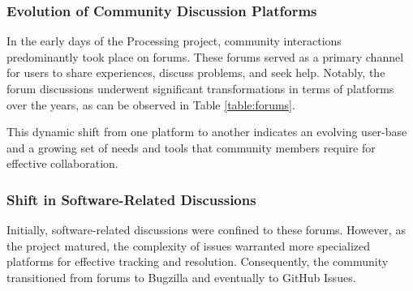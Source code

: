 \documentclass{article}
\begin{document}
\subsubsection*{Evolution of Community Discussion Platforms}
In the early days of the Processing project, community interactions predominantly took place on forums. These forums served as a primary channel for users to share experiences, discuss problems, and seek help. Notably, the forum discussions underwent significant transformations in terms of platforms over the years, as can be observed in Table \ref{table:forums}. \parencite{ProcessingForum}



This dynamic shift from one platform to another indicates an evolving user-base and a growing set of needs and tools that community members require for effective collaboration.

\subsubsection*{Shift in Software-Related Discussions}

Initially, software-related discussions were confined to these forums. However, as the project matured, the complexity of issues warranted more specialized platforms for effective tracking and resolution. Consequently, the community transitioned from forums to Bugzilla \parencite{BugzillaArchiveProcessing} and eventually to GitHub Issues\parencite{ProcessingProcessingSource}\parencite{ProcessingProcessing4Processing}. 
\end{document}
